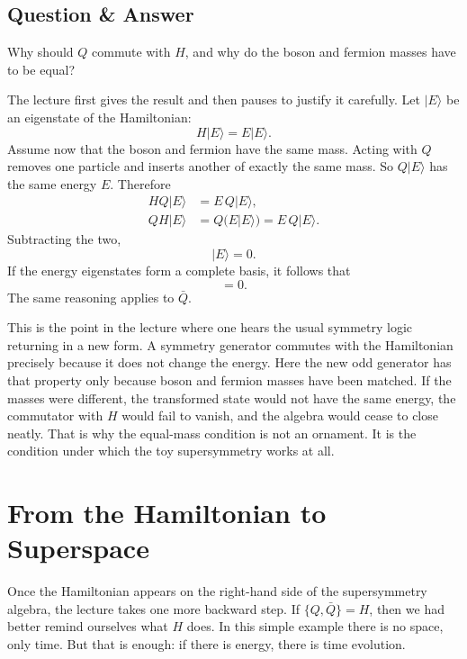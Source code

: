 \subsection{Question \& Answer}

Why should \(Q\) commute with \(H\), and why do the boson and fermion masses have to be equal?

The lecture first gives the result and then pauses to justify it carefully. Let \(|E\rangle\) be an eigenstate of the Hamiltonian:
\begin{equation}
H|E\rangle=E|E\rangle.
\end{equation}
Assume now that the boson and fermion have the same mass. Acting with \(Q\) removes one particle and inserts another of exactly the same mass. So \(Q|E\rangle\) has the same energy \(E\). Therefore
\begin{align}
HQ|E\rangle &= E\,Q|E\rangle, \\
QH|E\rangle &= Q(E|E\rangle)=E\,Q|E\rangle.
\end{align}
Subtracting the two,
\begin{equation}
[Q,H]|E\rangle=0.
\end{equation}
If the energy eigenstates form a complete basis, it follows that
\begin{equation}
[Q,H]=0.
\end{equation}
The same reasoning applies to \(\bar Q\).

This is the point in the lecture where one hears the usual symmetry logic returning in a new form. A symmetry generator commutes with the Hamiltonian precisely because it does not change the energy. Here the new odd generator has that property only because boson and fermion masses have been matched. If the masses were different, the transformed state would not have the same energy, the commutator with \(H\) would fail to vanish, and the algebra would cease to close neatly. That is why the equal-mass condition is not an ornament. It is the condition under which the toy supersymmetry works at all.

\section{From the Hamiltonian to Superspace}

Once the Hamiltonian appears on the right-hand side of the supersymmetry algebra, the lecture takes one more backward step. If \(\{Q,\bar Q\}=H\), then we had better remind ourselves what \(H\) does. In this simple example there is no space, only time. But that is enough: if there is energy, there is time evolution.

